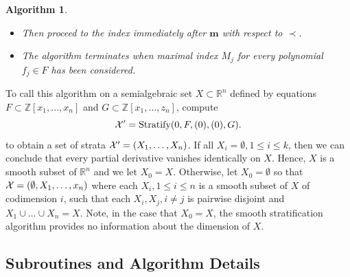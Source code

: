 \documentclass[
]{book}
\newtheorem{algorithm}{Algorithm}
\theoremstyle{definition}
\theoremstyle{definition}
\theoremstyle{definition}
\theoremstyle{definition}
\theoremstyle{remark}
\begin{document}
\begin{algorithm}
\begin{itemize}
\begin{itemize}
\begin{itemize}
\begin{itemize}
\begin{itemize}
          \begin{itemize}
          \item
            \(X' := \{ \mathbf{x} \in \mathbb{R}^n \mid s(\mathbf{x}) = 0 \}\),
          \item
            \({\cal F} := {\cal F} \cup \{ ((0,\ldots,0,i_\ell,\ldots,i_{k+1},j), s) \}\),
          \end{itemize}
        \item
          \(F := F:s\) (i.e., append \(s\) to the end of list \(F\)).
        \end{itemize}
      \item
        Then proceed to the index immediately after \(\mathbf{m}\) with respect to \(\prec\).
      \item
        The algorithm terminates when maximal index \(M_j\) for every polynomial \(f_j \in F\) has been considered.
      \end{itemize}
    \end{itemize}
  \end{itemize}
\end{itemize}

\end{algorithm}

To call this algorithm on a semialgebraic set \(X \subset \mathbb{R}^n\) defined by equations \(F \subset \mathbb{Z}[x_1,\ldots,x_n]\) and \(G \subset \mathbb{Z}[x_1,\ldots,z_n]\), compute
\[
{\cal X}' = {\rm Stratify}(0, F, (0), (0), G).
\]
to obtain a set of strata \({\cal X'} = (X_1, \ldots, X_n)\).
If all \(X_i = \emptyset, 1 \le i \le k\), then we can conclude that every partial derivative vanishes identically on \(X\). Hence, \(X\) is a smooth subset of \(\mathbb{R}^n\) and we let \(X_0 = X\).
Otherwise, let \(X_0 = \emptyset\) so that \({\cal X} = (\emptyset, X_1,\ldots,x_n)\) where each \(X_i,1\le i \le n\) is a smooth subset of \(X\) of codimension \(i\), such that each \(X_i,X_j,i\ne j\) is pairwise disjoint and \(X_1\cup \ldots \cup X_n = X\).
Note, in the case that \(X_0 = X\), the smooth stratification algorithm provides no information about the dimension of \(X\).

\hypertarget{sec:strat-algorithm-details}{%
\subsection{Subroutines and Algorithm Details}\label{sec:strat-algorithm-details}}
\end{document}
